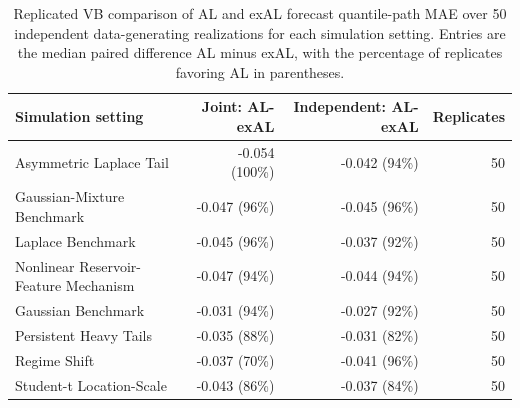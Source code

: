 \begin{table}[!htbp]
\centering
\scriptsize
\begin{tabular}{@{}>{\raggedright\arraybackslash}p{}rrr@{}}
\toprule
Simulation setting & Joint: AL-exAL & Independent: AL-exAL & Replicates
\\
\midrule
Asymmetric Laplace Tail & -0.054 (100\%) & -0.042 (94\%) & 50 \\
Gaussian-Mixture Benchmark & -0.047 (96\%) & -0.045 (96\%) & 50 \\
Laplace Benchmark & -0.045 (96\%) & -0.037 (92\%) & 50 \\
Nonlinear Reservoir-Feature Mechanism & -0.047 (94\%) & -0.044 (94\%) & 50 \\
Gaussian Benchmark & -0.031 (94\%) & -0.027 (92\%) & 50 \\
Persistent Heavy Tails & -0.035 (88\%) & -0.031 (82\%) & 50 \\
Regime Shift & -0.037 (70\%) & -0.041 (96\%) & 50 \\
Student-t Location-Scale & -0.043 (86\%) & -0.037 (84\%) & 50 \\
\bottomrule
\end{tabular}
\caption{Replicated VB comparison of AL and exAL forecast quantile-path MAE over 50 independent data-generating realizations for each simulation setting. Entries are the median paired difference AL minus exAL, with the percentage of replicates favoring AL in parentheses.}
\label{tab:joint-qdesn-article-validation-phase153-replication-summary}
\end{table}
